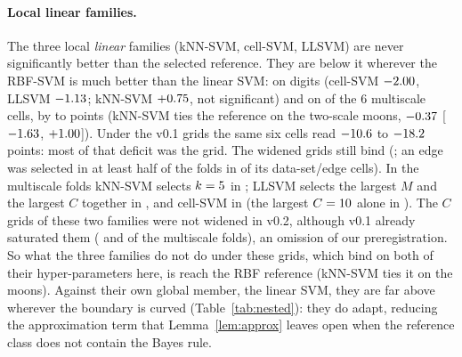 \documentclass[11pt,a4paper]{article}
\theoremstyle{plain}
\theoremstyle{definition}
\theoremstyle{remark}
\begin{document}
\paragraph{Local linear families.} The three local \emph{linear} families (kNN-SVM, cell-SVM, LLSVM) are never significantly better than the selected reference. They are below it wherever the RBF-SVM is much better than the linear SVM: on digits (cell-SVM $-2.00$, LLSVM $-1.13$; kNN-SVM $+0.75$, not significant) and on \NNegLinLocalMulti{} of the 6 multiscale cells, by \NegLinLocalMultiLoAbs{} to \NegLinLocalMultiHiAbs{} points (kNN-SVM ties the reference on the two-scale moons, $-0.37$ [$-1.63$, $+1.00$]). Under the v0.1 grids the same six cells read $-10.6$ to $-18.2$ points: most of that deficit was the grid. The widened grids still bind (; an edge was selected in at least half of the folds in \EdgeMainNHalfOrMore{} of its \EdgeMainNCells{} data-set/edge cells). In the \EdgeMainMultiN{} multiscale folds kNN-SVM selects $k=5$ in \EdgeMainMultiKnnKLo{}; LLSVM selects the largest $M$ and the largest $C$ together in \EdgeMainMultiLlsvmBothHi{}, and cell-SVM in \EdgeMainMultiCellBothHi{} (the largest $C=10$ alone in \EdgeMainMultiCellCHi{}). The $C$ grids of these two families were not widened in v0.2, although v0.1 already saturated them (\VOneEdgeCellCHi{} and \VOneEdgeLlsvmCHi{} of the multiscale folds), an omission of our preregistration. So what the three families do not do under these grids, which bind on both of their hyper-parameters here, is reach the RBF reference (kNN-SVM ties it on the moons). Against their own global member, the linear SVM, they are far above wherever the boundary is curved (Table~\ref{tab:nested}): they do adapt, reducing the approximation term that Lemma~\ref{lem:approx} leaves open when the reference class does not contain the Bayes rule.
\end{document}
